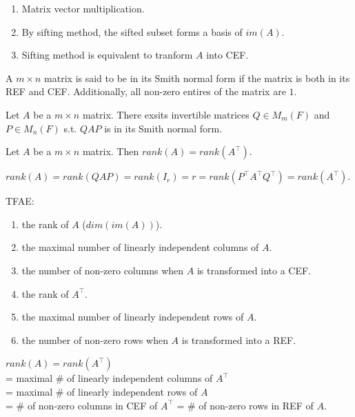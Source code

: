 \documentclass[12pt]{article}
\begin{document}
\begin{pfbox}
    \begin{enumerate}
        \item Matrix vector multiplication.
        \item By sifting method, the sifted subset forms a basis of $im(A)$.
        \item Sifting method is equivalent to tranform $A$ into CEF.
    \end{enumerate}
\end{pfbox}

\begin{definition}
 A $m\times n$ matrix is said to be in its Smith normal form if the matrix is both in its REF and CEF.
 Additionally, all non-zero entires of the matrix are $1$.
\end{definition}

\begin{theorem}
Let $A$ be a $m\times n$ matrix.
There exsits invertible matrices $Q\in M_m(F)$ and $P\in M_n(F)$ s.t.
$QAP$ is in its Smith normal form.
\end{theorem}


\begin{theorem}
    Let $A$ be a $m\times n$ matrix. Then $rank(A)=rank(A^{\top})$.
\end{theorem}

\begin{pfbox}
    $rank(A)=rank(QAP)=rank(I_r)=r=rank(P^\top A^\top Q^\top)=rank(A^\top).$
\end{pfbox}


\begin{theorem}
    TFAE:
    \begin{enumerate}
        \item the rank of $A$ ($dim(im(A))$).
        \item the maximal number of linearly independent columns of $A$.
        \item the number of non-zero columns when $A$ is transformed into a CEF.
        \item the rank of $A^\top$.
        \item the maximal number of linearly independent rows of $A$.
        \item the number of non-zero rows when $A$ is transformed into a REF.
    \end{enumerate}
\end{theorem}

\begin{pfbox}
    $rank(A)=rank(A^\top)$\\
    = maximal \# of linearly independent columns of $A^\top$\\
    = maximal \# of linearly independent rows of $A$\\
    = \# of non-zero columns in CEF of $A^\top$ = \# of non-zero rows in REF of $A$.
\end{pfbox}
\end{document}
